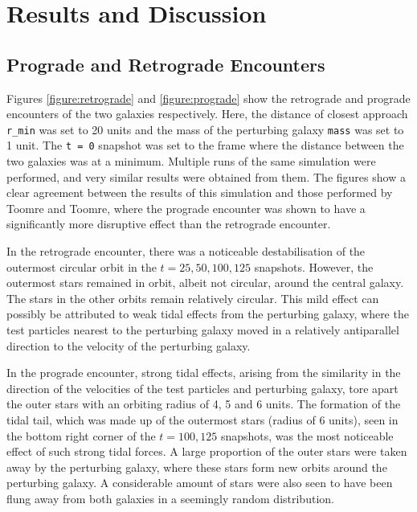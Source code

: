 \documentclass[twoside,twocolumn]{article}
\begin{document}
        
\section{Results and Discussion}   

    \subsection{Prograde and Retrograde Encounters}

        Figures \ref{figure:retrograde} and \ref{figure:prograde} show the retrograde and prograde encounters of the two galaxies respectively. Here, the distance of closest approach \texttt{r\_min} was set to 20 units and the mass of the perturbing galaxy \texttt{mass} was set to 1 unit. The \texttt{t = 0} snapshot was set to the frame where the distance between the two galaxies was at a minimum. Multiple runs of the same simulation were performed, and very similar results were obtained from them. The figures show a clear agreement between the results of this simulation and those performed by Toomre and Toomre, where the prograde encounter was shown to have a significantly more disruptive effect than the retrograde encounter. 
        
        In the retrograde encounter, there was a noticeable destabilisation of the outermost circular orbit in the $t = 25, 50, 100, 125$ snapshots. However, the outermost stars remained in orbit, albeit not circular, around the central galaxy. The stars in the other orbits remain relatively circular. This mild effect can possibly be attributed to weak tidal effects from the perturbing galaxy, where the test particles nearest to the perturbing galaxy moved in a relatively antiparallel direction to the velocity of the perturbing galaxy.
        
        In the prograde encounter, strong tidal effects, arising from the similarity in the direction of the velocities of the test particles and perturbing galaxy, tore apart the outer stars with an orbiting radius of 4, 5 and 6 units. The formation of the tidal tail, which was made up of the outermost stars (radius of 6 units), seen in the bottom right corner of the $t = 100, 125$ snapshots, was the most noticeable effect of such strong tidal forces. A large proportion of the outer stars were taken away by the perturbing galaxy, where these stars form new orbits around the perturbing galaxy. A considerable amount of stars were also seen to have been flung away from both galaxies in a seemingly random distribution.
\end{document}
